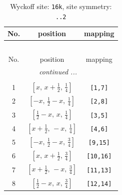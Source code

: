 \documentclass[fleqn,8pt]{jsarticle}
\begin{document}
\renewcommand{\arraystretch}{1.2}
\begin{longtable}{ccc}
\caption{Wyckoff site: {\tt 16k}, site symmetry: {\tt ..2}}
 \\
 \hline \hline
No. & position & mapping \\ \hline \endfirsthead

\multicolumn{2}{l}{\tablename\ \thetable{}} \\
 \hline \hline
No. & position & mapping \\ \hline \endhead

 \hline \hline
\multicolumn{2}{r}{\footnotesize\it continued ...} \\ \endfoot

 \hline \hline
\multicolumn{2}{r}{} \\ \endlastfoot

1 & $\left[ x,\, x + \frac{1}{2},\, \frac{1}{4} \right]$ & {\tt [1,7]} \\ \hline
2 & $\left[ - x,\, \frac{1}{2} - x,\, \frac{1}{4} \right]$ & {\tt [2,8]} \\ \hline
3 & $\left[ \frac{1}{2} - x,\, x,\, \frac{1}{4} \right]$ & {\tt [3,5]} \\ \hline
4 & $\left[ x + \frac{1}{2},\, - x,\, \frac{1}{4} \right]$ & {\tt [4,6]} \\ \hline
5 & $\left[ - x,\, \frac{1}{2} - x,\, \frac{3}{4} \right]$ & {\tt [9,15]} \\ \hline
6 & $\left[ x,\, x + \frac{1}{2},\, \frac{3}{4} \right]$ & {\tt [10,16]} \\ \hline
7 & $\left[ x + \frac{1}{2},\, - x,\, \frac{3}{4} \right]$ & {\tt [11,13]} \\ \hline
8 & $\left[ \frac{1}{2} - x,\, x,\, \frac{3}{4} \right]$ & {\tt [12,14]} \\
\end{longtable}
\renewcommand{\arraystretch}{1.2}
\end{document}
